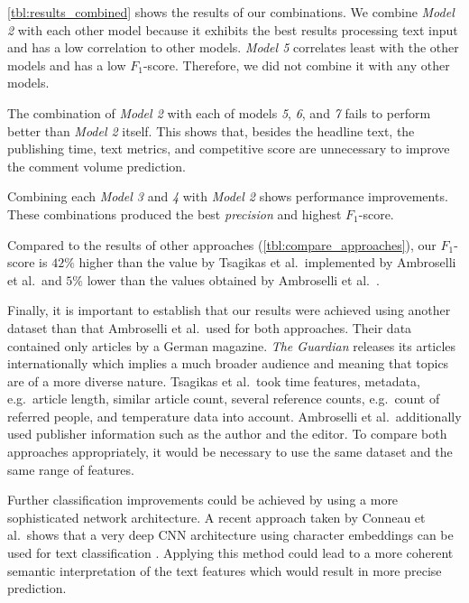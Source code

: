 \autoref{tbl:results_combined} shows the results of our combinations. We combine \textit{Model 2} with each other model because it exhibits the best results processing text input and has a low correlation to other models.
\textit{Model 5} correlates least with the other models and has a low $F_1$-score. Therefore, we did not combine it with any other models.



The combination of \textit{Model 2} with each of models \textit{5}, \textit{6}, and \textit{7} fails to perform better than \textit{Model 2} itself. 
This shows that, besides the headline text, the publishing time, text metrics, and competitive score are unnecessary to improve the comment volume prediction.

Combining each \textit{Model 3} and \textit{4} with \textit{Model 2} shows performance improvements. 
These combinations produced the best \textit{precision} and highest $F_1$-score.

Compared to the results of other approaches (\autoref{tbl:compare_approaches}), our $F_1$-score is $42\%$ higher than the value by Tsagikas et al.\ implemented by Ambroselli et al.\ and $5\%$ lower than the values obtained by Ambroselli et al.\ \cite{ambroselli2018prediction}.



Finally, it is important to establish that our results were achieved using another dataset than that Ambroselli et al.\ used for both approaches.
Their data contained only articles by a German magazine. 
\textit{The Guardian} releases its articles internationally which implies a much broader audience and meaning that topics are of a more diverse nature.
Tsagikas et al.\ took time features, metadata, e.g.\ article length, similar article count, several reference counts, e.g.\ count of referred people, and temperature data into account.
Ambroselli et al.\ additionally used publisher information such as the author and the editor.
To compare both approaches appropriately, it would be necessary to use the same dataset and the same range of features.

Further classification improvements could be achieved by using a more sophisticated network architecture. 
A recent approach taken by Conneau et al.\ shows that a very deep CNN architecture using character embeddings can be used for text classification \cite{conneau2016very}. 
Applying this method could lead to a more coherent semantic interpretation of the text features which would result in more precise prediction.